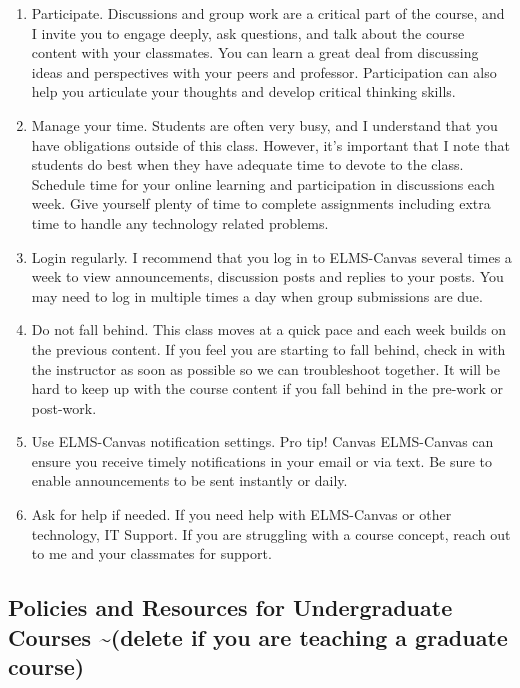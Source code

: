 \documentclass[11pt]{article}
\def\tightlist{}
\begin{document}
\begin{enumerate}
\def\labelenumi{\arabic{enumi}.}
\tightlist
\item
  Participate. Discussions and group work are a critical part of the
  course, and I invite you to engage deeply, ask questions, and talk
  about the course content with your classmates. You can learn a great
  deal from discussing ideas and perspectives with your peers and
  professor. Participation can also help you articulate your thoughts
  and develop critical thinking skills.
\item
  Manage your time. Students are often very busy, and I understand that
  you have obligations outside of this class. However, it's important
  that I note that students do best when they have adequate time to
  devote to the class. Schedule time for your online learning and
  participation in discussions each week. Give yourself plenty of time
  to complete assignments including extra time to handle any technology
  related problems.
\item
  Login regularly. I recommend that you log in to ELMS-Canvas several
  times a week to view announcements, discussion posts and replies to
  your posts. You may need to log in multiple times a day when group
  submissions are due.
\item
  Do not fall behind. This class moves at a quick pace and each week
  builds on the previous content. If you feel you are starting to fall
  behind, check in with the instructor as soon as possible so we can
  troubleshoot together. It will be hard to keep up with the course
  content if you fall behind in the pre-work or post-work.
\item
  Use ELMS-Canvas notification settings. Pro tip! Canvas ELMS-Canvas can
  ensure you receive timely notifications in your email or via text. Be
  sure to enable announcements to be sent instantly or daily.
\item
  Ask for help if needed. If you need help with ELMS-Canvas or other
  technology, IT Support. If you are struggling with a course concept,
  reach out to me and your classmates for support.
\end{enumerate}

\hypertarget{policies-and-resources-for-undergraduate-courses-delete-if-you-are-teaching-a-graduate-course}{%
\subsection{Policies and Resources for Undergraduate Courses
\textasciitilde(delete if you are teaching a graduate
course)}\label{policies-and-resources-for-undergraduate-courses-delete-if-you-are-teaching-a-graduate-course}}
\end{document}
